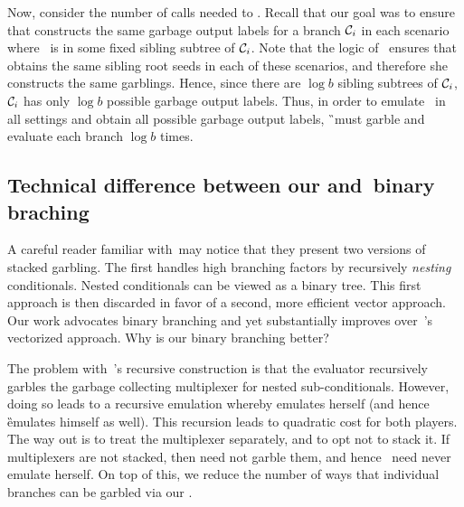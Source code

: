 Now, consider the number of calls needed to \Ev.  Recall that our
goal was to ensure that \E constructs the same garbage output labels
for a branch $\mathcal C_i$ in each scenario where \aid\ is in some fixed
sibling subtree of $\mathcal C_i$. Note that the logic of \gadget\ ensures
that \E obtains the same sibling root seeds in each of these
scenarios, and therefore she constructs the same garblings. Hence,
since there are $\log b$ sibling subtrees of $\mathcal C_i$, $\mathcal C_i$ has
only $\log b$ possible garbage output labels.
Thus, in order to emulate \E\ in all settings and obtain all possible
garbage output labels, \G\ must garble and evaluate each branch $\log b$ times.


\subsection{Technical difference between our and~\HK binary braching}
\label{sec:techOverviewDiff}

A careful reader familiar with~\HK may notice that they present two
versions of stacked garbling.
The first handles high branching factors by recursively \emph{nesting}
conditionals.
Nested conditionals can be viewed as a binary
tree.
This first approach is then discarded in favor of a second, more efficient vector approach.
Our work advocates binary branching and yet substantially improves
over~\HK's vectorized approach.
Why is our binary branching better?

The problem with~\HK's recursive construction
is that the evaluator \E recursively garbles the garbage collecting multiplexer for
nested sub-conditionals.
However, doing so leads to a recursive emulation whereby \E
emulates herself (and hence \G emulates himself as well).
This recursion leads to quadratic cost for both players.
The way out is to treat the multiplexer separately, and to opt not
to stack it.
If multiplexers are not stacked, then \E need not garble them, and
hence \E\ need never emulate herself.
On top of this, we reduce the number of ways that individual branches
can be garbled via our \gadget.

